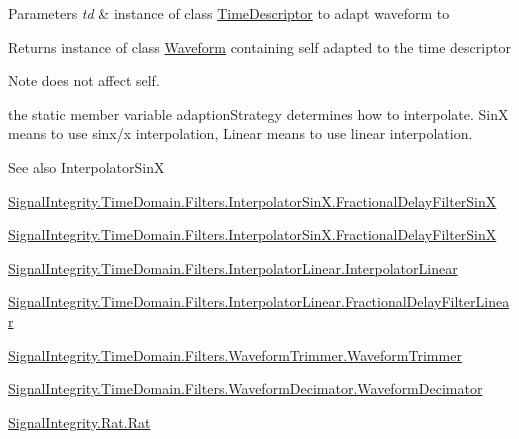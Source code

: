 \begin{DoxyParams}{Parameters}
{\em td} & instance of class \hyperlink{namespaceSignalIntegrity_1_1TimeDomain_1_1Waveform_1_1TimeDescriptor}{Time\+Descriptor} to adapt waveform to \\
\hline
\end{DoxyParams}
\begin{DoxyReturn}{Returns}
instance of class \hyperlink{classSignalIntegrity_1_1TimeDomain_1_1Waveform_1_1Waveform_1_1Waveform}{Waveform} containing self adapted to the time descriptor 
\end{DoxyReturn}
\begin{DoxyNote}{Note}
does not affect self. 

the static member variable adaption\+Strategy determines how to interpolate. \textquotesingle{}SinX\textquotesingle{} means to use sinx/x interpolation, \textquotesingle{}Linear\textquotesingle{} means to use linear interpolation. 
\end{DoxyNote}
\begin{DoxySeeAlso}{See also}
Interpolator\+SinX 

\hyperlink{classSignalIntegrity_1_1TimeDomain_1_1Filters_1_1InterpolatorSinX_1_1FractionalDelayFilterSinX}{Signal\+Integrity.\+Time\+Domain.\+Filters.\+Interpolator\+Sin\+X.\+Fractional\+Delay\+Filter\+SinX} 

\hyperlink{classSignalIntegrity_1_1TimeDomain_1_1Filters_1_1InterpolatorSinX_1_1FractionalDelayFilterSinX}{Signal\+Integrity.\+Time\+Domain.\+Filters.\+Interpolator\+Sin\+X.\+Fractional\+Delay\+Filter\+SinX} 

\hyperlink{classSignalIntegrity_1_1TimeDomain_1_1Filters_1_1InterpolatorLinear_1_1InterpolatorLinear}{Signal\+Integrity.\+Time\+Domain.\+Filters.\+Interpolator\+Linear.\+Interpolator\+Linear} 

\hyperlink{classSignalIntegrity_1_1TimeDomain_1_1Filters_1_1InterpolatorLinear_1_1FractionalDelayFilterLinear}{Signal\+Integrity.\+Time\+Domain.\+Filters.\+Interpolator\+Linear.\+Fractional\+Delay\+Filter\+Linear} 

\hyperlink{classSignalIntegrity_1_1TimeDomain_1_1Filters_1_1WaveformTrimmer_1_1WaveformTrimmer}{Signal\+Integrity.\+Time\+Domain.\+Filters.\+Waveform\+Trimmer.\+Waveform\+Trimmer} 

\hyperlink{classSignalIntegrity_1_1TimeDomain_1_1Filters_1_1WaveformDecimator_1_1WaveformDecimator}{Signal\+Integrity.\+Time\+Domain.\+Filters.\+Waveform\+Decimator.\+Waveform\+Decimator} 

\hyperlink{namespaceSignalIntegrity_1_1Rat_1_1Rat}{Signal\+Integrity.\+Rat.\+Rat} 
\end{DoxySeeAlso}


